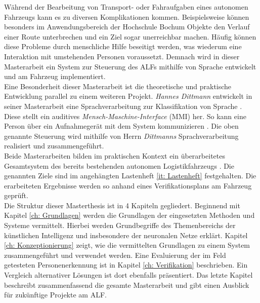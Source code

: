 		Während der Bearbeitung von Transport- oder Fahraufgaben eines autonomen Fahrzeugs kann es zu diversen Komplikationen kommen. Beispielsweise können besonders im Anwendungsbereich der Hochschule Bochum Objekte den Verlauf einer Route unterbrechen und ein Ziel sogar unerreichbar machen. Häufig können diese Probleme durch menschliche Hilfe beseitigt werden, was wiederum eine Interaktion mit umstehenden Personen voraussetzt. Demnach wird in dieser Masterarbeit ein System zur Steuerung des ALFs mithilfe von Sprache entwickelt und am Fahrzeug implementiert.\\
		
		Eine Besonderheit dieser Masterarbeit ist die theoretische und praktische Entwicklung parallel zu einem weiteren Projekt. \textit{Hannes Dittmann} entwickelt in seiner Masterarbeit eine Sprachverarbeitung zur Klassifikation von Sprache \cite{Dittmann}. Diese stellt ein auditives \textit{Mensch-Maschine-Interface} (MMI) her. So kann eine Person über ein Aufnahmegerät mit dem System kommunizieren \cite{Dittmann}. Die oben genannte Steuerung wird mithilfe von Herrn \textit{Dittmanns} Sprachverarbeitung realisiert und zusammengeführt.\\
		
		Beide Masterarbeiten bilden im praktischen Kontext ein überarbeitetes Gesamtsystem des bereits bestehenden autonomen Logistikfahrzeugs \cite{Dittmann}. Die genannten Ziele sind im angehängten Lastenheft \ref{it: Lastenheft} festgehalten. Die erarbeiteten Ergebnisse werden so anhand eines Verifikationsplans am Fahrzeug geprüft.\\
		
		Die Struktur dieser Masterthesis ist in 4 Kapiteln gegliedert. Beginnend mit Kapitel \ref{ch: Grundlagen} werden die Grundlagen der eingesetzten Methoden und Systeme vermittelt. Hierbei werden Grundbegriffe des Themenbereichs der künstlichen Intelligenz und insbesondere der neuronalen Netze erklärt. Kapitel \ref{ch: Konzeptionierung} zeigt, wie die vermittelten Grundlagen zu einem System zusammengeführt und verwendet werden. Eine Evaluierung der im Feld getesteten Personenerkennung ist in Kapitel \ref{ch: Verifikation} beschrieben. Ein Vergleich alternativer Lösungen ist dort ebenfalls präsentiert. Das letzte Kapitel beschreibt zusammenfassend die gesamte Masterarbeit und gibt einen Ausblick für zukünftige Projekte am ALF. \\
		
		
		
		
		
		
	